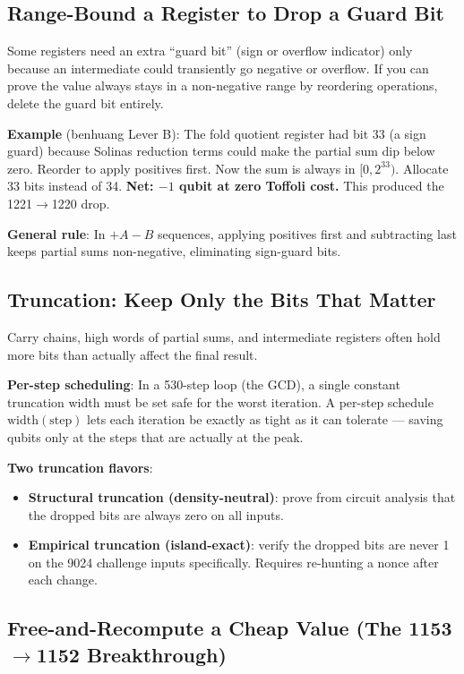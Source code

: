 \documentclass[11pt,a4paper]{article}
\newcommand{\tof}{Toffoli\xspace}
\begin{document}
\subsection{Range-Bound a Register to Drop a Guard Bit}

Some registers need an extra ``guard bit'' (sign or overflow indicator) only because an
intermediate could transiently go negative or overflow. If you can prove the value always stays
in a non-negative range by reordering operations, delete the guard bit entirely.

\textbf{Example} (benhuang Lever B): The fold quotient register had bit 33 (a sign guard) because
Solinas reduction terms could make the partial sum dip below zero. Reorder to apply positives
first. Now the sum is always in $[0, 2^{33})$. Allocate 33 bits instead of 34.
\textbf{Net: $-1$ qubit at zero \tof cost.} This produced the 1221$\to$1220 drop.

\textbf{General rule}: In $+A - B$ sequences, applying positives first and subtracting last
keeps partial sums non-negative, eliminating sign-guard bits.

\subsection{Truncation: Keep Only the Bits That Matter}

Carry chains, high words of partial sums, and intermediate registers often hold more bits than
actually affect the final result.

\textbf{Per-step scheduling}: In a 530-step loop (the GCD), a single constant truncation width
must be set safe for the worst iteration. A per-step schedule $\text{width}(\text{step})$ lets
each iteration be exactly as tight as it can tolerate --- saving qubits only at the steps that
are actually at the peak.

\textbf{Two truncation flavors}:
\begin{itemize}
  \item \textbf{Structural truncation (density-neutral)}: prove from circuit analysis that the
    dropped bits are always zero on all inputs.
  \item \textbf{Empirical truncation (island-exact)}: verify the dropped bits are never 1 on the
    9024 challenge inputs specifically. Requires re-hunting a nonce after each change.
\end{itemize}

\subsection{Free-and-Recompute a Cheap Value (The 1153$\to$1152 Breakthrough)}
\end{document}
